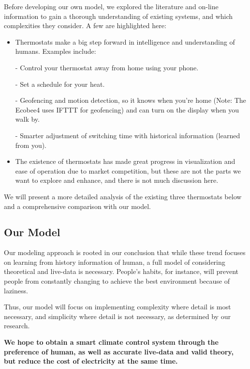 \documentclass{mcmthesis}
\begin{document}
			Before developing our own model, we explored the literature and on-line information to gain a thorough understanding of existing systems, and which complexities they consider. A few are highlighted here:
			
			
			\begin{itemize}
				\item Thermostats make a big step forward in intelligence and understanding of humans. Examples include:
				\item[-]Control your thermostat away from home using your phone.
				\item[-]Set a schedule for your heat.
				\item[-]Geofencing and motion detection, so it knows when you’re home (Note: The Ecobee4 uses IFTTT for geofencing) and can turn on the display when you walk by.
				\item[-]Smarter adjustment of switching time with historical information (learned from you).
				\item The existence of thermostats has made great progress in visualization and ease of operation due to market competition, but these are not the parts we want to explore and enhance, and there is not much discussion here.
			\end{itemize}
		
			We will present a more detailed analysis of the existing three thermostats below and a comprehensive comparison with our model.
		
		
		\subsection{Our Model}
		
			Our modeling approach is rooted in our conclusion that while these trend focuses on learning from history information of human, a full model of considering theoretical and live-data is necessary. People's habits, for instance, will prevent people from constantly changing to achieve the best environment because of laziness.
			
			Thus, our model will focus on implementing complexity where detail is most necessary, and simplicity where detail is not necessary, as determined by our research. 
			
			\textbf{We hope to obtain a smart climate control system through the preference of human, as well as accurate live-data and valid theory, but reduce the cost of electricity at the same time.} 
	
\end{document}
